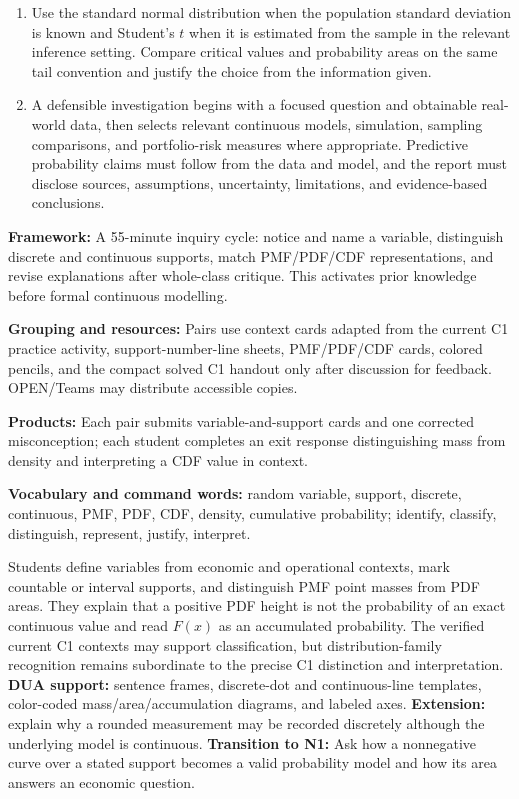 \documentclass[10pt,letterpaper]{article}
\newcommand{\labelled}[2]{\textbf{#1:} #2\par}
\newcommand{\plansection}[1]{\Needspace{8\baselineskip}\par\vspace{8pt}{\large\bfseries #1\par}\vspace{3pt}}
\newcommand{\criterionpart}[1]{\Needspace{10\baselineskip}\par\vspace{4pt}{\bfseries #1\par}}
\begin{document}
\begin{enumerate}[label=\textbf{\arabic*.}]
		\item Use the standard normal distribution when the population standard deviation is known and Student's $t$ when it is estimated from the sample in the relevant inference setting. Compare critical values and probability areas on the same tail convention and justify the choice from the information given.
		\item A defensible investigation begins with a focused question and obtainable real-world data, then selects relevant continuous models, simulation, sampling comparisons, and portfolio-risk measures where appropriate. Predictive probability claims must follow from the data and model, and the report must disclose sources, assumptions, uncertainty, limitations, and evidence-based conclusions.
	\end{enumerate}
	
	\plansection{4. Pre-lesson and Context: C1 Discovery Opening}
	\labelled{Framework}{A 55-minute inquiry cycle: notice and name a variable, distinguish discrete and continuous supports, match PMF/PDF/CDF representations, and revise explanations after whole-class critique. This activates prior knowledge before formal continuous modelling.}
	\labelled{Grouping and resources}{Pairs use context cards adapted from the current C1 practice activity, support-number-line sheets, PMF/PDF/CDF cards, colored pencils, and the compact solved C1 handout only after discussion for feedback. OPEN/Teams may distribute accessible copies.}
	\labelled{Products}{Each pair submits variable-and-support cards and one corrected misconception; each student completes an exit response distinguishing mass from density and interpreting a CDF value in context.}
	\labelled{Vocabulary and command words}{random variable, support, discrete, continuous, PMF, PDF, CDF, density, cumulative probability; identify, classify, distinguish, represent, justify, interpret.}
	
	\criterionpart{Opening sequence}
	Students define variables from economic and operational contexts, mark countable or interval supports, and distinguish PMF point masses from PDF areas. They explain that a positive PDF height is not the probability of an exact continuous value and read $F(x)$ as an accumulated probability. The verified current C1 contexts may support classification, but distribution-family recognition remains subordinate to the precise C1 distinction and interpretation. \textbf{DUA support:} sentence frames, discrete-dot and continuous-line templates, color-coded mass/area/accumulation diagrams, and labeled axes. \textbf{Extension:} explain why a rounded measurement may be recorded discretely although the underlying model is continuous.
	\labelled{Transition to N1}{Ask how a nonnegative curve over a stated support becomes a valid probability model and how its area answers an economic question.}
	
\end{document}
